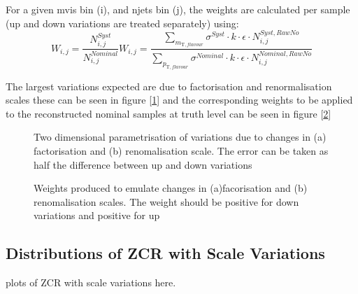For a given mvis bin (i), and njets bin (j), the weights are calculated per sample (up and down variations are treated separately) using:
\[W_{i,j}=
\frac{N_{i,j}^{Syst}}{N_{i,j}^{Nominal}}W_{i,j}
= \frac{\sum_{m_{\mathrm{T},flavour}}\sigma^{Syst}\cdot k\cdot\epsilon\cdot N_{i,j}^{Syst,RawNo}}{\sum_{p_{\mathrm{T},flavour}}\sigma^{Nominal}\cdot k\cdot\epsilon\cdot N_{i,j}^{Nominal,RawNo}}
\]

The largest variations expected are due to factorisation and renormalisation scales these can be seen in figure [\ref{fig:scales}] and the corresponding weights to be applied to the reconstructed nominal samples at truth level can be seen in figure [\ref{fig:weight}]

\begin{figure}[h!]
  \centering

   \caption{Two dimensional parametrisation of variations due to changes in (a) factorisation and (b) renomalisation scale. The error can be taken as half the difference between up and down variations}
  \label{fig:scales}
\end{figure}

\begin{figure}[h!]
  \centering

   \caption{Weights produced to emulate changes in (a)facorisation and (b) renomalisation scales. The weight should be positive for down variations and positive for up}
  \label{fig:weight}
\end{figure}

\subsection{Distributions of ZCR with Scale Variations}

plots of ZCR with scale variations here. 
